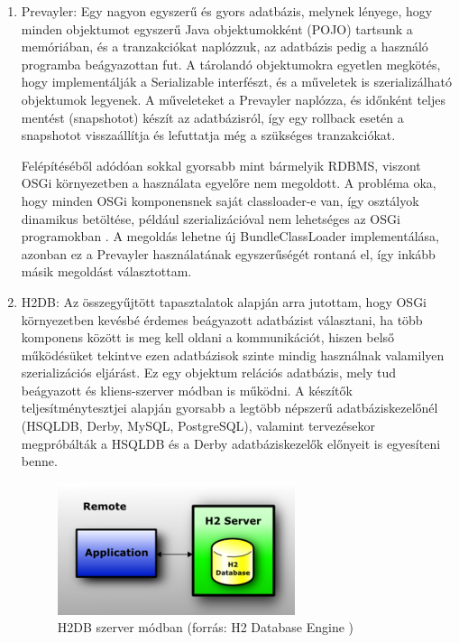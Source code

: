 \begin{enumerate}
	\item Prevayler: Egy nagyon egyszerű és gyors adatbázis, melynek lényege, hogy minden objektumot egyszerű Java objektumokként (POJO) tartsunk a memóriában, és a tranzakciókat naplózzuk, az adatbázis pedig a használó programba beágyazottan fut. A tárolandó objektumokra egyetlen megkötés, hogy implementálják a Serializable interfészt, és a műveletek is szerializálható objektumok legyenek. A műveleteket a Prevayler naplózza, és időnként teljes mentést (snapshotot) készít az adatbázisról, így egy rollback esetén a snapshotot visszaállítja és lefuttatja még a szükséges tranzakciókat.
	
Felépítéséből adódóan sokkal gyorsabb mint bármelyik RDBMS, viszont OSGi környezetben a használata egyelőre nem megoldott. A probléma oka, hogy minden OSGi komponensnek saját classloader-e van, így osztályok dinamikus betöltése, például szerializációval nem lehetséges az OSGi programokban \cite{hall04osgi}. A megoldás lehetne új BundleClassLoader implementálása, azonban ez a Prevayler használatának egyszerűségét rontaná el, így inkább másik megoldást választottam.

    \item H2DB: Az összegyűjtött tapasztalatok alapján arra jutottam, hogy OSGi környezetben kevésbé érdemes beágyazott adatbázist választani, ha több komponens között is meg kell oldani a kommunikációt, hiszen belső működésüket tekintve ezen adatbázisok szinte mindig használnak valamilyen szerializációs eljárást. Ez egy objektum relációs adatbázis, mely tud beágyazott és kliens-szerver módban is működni. A készítők teljesítménytesztjei alapján gyorsabb a legtöbb népszerű adatbáziskezelőnél (HSQLDB, Derby, MySQL, PostgreSQL), valamint tervezésekor megpróbálták a HSQLDB és a Derby adatbáziskezelők előnyeit is egyesíteni benne.
    
\begin{figure}[htp]
\centering
\includegraphics[scale=1.0]{img/h2db}
\caption{H2DB szerver módban (forrás: H2 Database Engine \cite{h2db})}
\label{fig:h2db}
\end{figure}


\end{enumerate}
